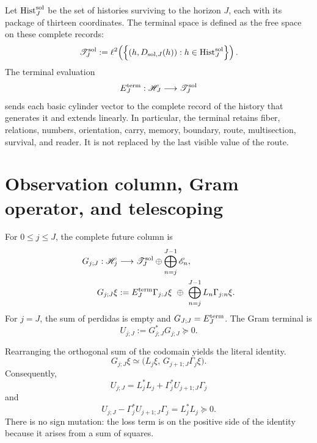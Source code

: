 Let \(\operatorname{Hist}_{J}^{\rm sol}\) be the set of histories
surviving to the horizon \(J\), each with its package of thirteen
coordinates.  The terminal space is defined as the free space on these
complete records:
\begin{equation}\label{eq:pdfv2-sol-terminal-space}
 \mathscr T_J^{\rm sol}
 :=\ell^2\!\left(
 \left\{(h,D_{{\rm sol},J}(h)):
 h\in\operatorname{Hist}_{J}^{\rm sol}\right\}
 \right).
\end{equation}
The terminal evaluation
\begin{equation}\label{eq:pdfv2-sol-terminal-evaluation}
 E_J^{\rm term}:\mathscr H_J\longrightarrow\mathscr T_J^{\rm sol}
\end{equation}
sends each basic cylinder vector to the complete record of the history that
generates it and extends linearly.  In particular, the terminal retains
fiber, relations, numbers, orientation, carry, memory, boundary, route,
multisection, survival, and reader.  It is not replaced by the last visible
value of the route.

\section{Observation column, Gram operator, and telescoping}
\label{sec:pdfv2-sol-gram}

For \(0\leq j\leq J\), the complete future column is
\begin{equation}\label{eq:pdfv2-sol-g-column}
 \begin{aligned}
 G_{j;J}:\mathscr H_j&\longrightarrow
 \mathscr T_J^{\rm sol}\oplus
 \bigoplus_{n=j}^{J-1}\mathscr E_n,\\
 G_{j;J}\xi
 &:={}
 E_J^{\rm term}\Gamma_{j:J}\xi
 \ \oplus\ 
 \bigoplus_{n=j}^{J-1}L_n\Gamma_{j:n}\xi.
 \end{aligned}
\end{equation}
For \(j=J\), the sum of perdidas is empty and
\(G_{J;J}=E_J^{\rm term}\).  The Gram terminal is
\begin{equation}\label{eq:pdfv2-sol-u-gram}
 U_{j;J}:=G_{j;J}^*G_{j;J}\succeq0.
\end{equation}

Rearranging the orthogonal sum of the codomain yields the literal identity.
\begin{equation}\label{eq:pdfv2-sol-g-recursion}
 G_{j;J}\xi
 \simeq
 \bigl(L_j\xi,\,G_{j+1;J}\Gamma_j\xi\bigr).
\end{equation}
Consequently,
\begin{equation}\label{eq:pdfv2-sol-stein}
 \boxed{U_{j;J}
 =L_j^*L_j+\Gamma_j^*U_{j+1;J}\Gamma_j}
\end{equation}
and
\begin{equation}\label{eq:pdfv2-sol-stein-difference}
 U_{j;J}-\Gamma_j^*U_{j+1;J}\Gamma_j
 =L_j^*L_j\succeq0.
\end{equation}
There is no sign mutation: the loss term is on the positive side
of the identity because it arises from a sum of squares.

